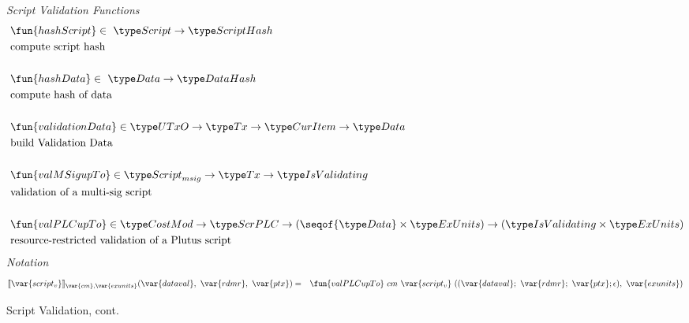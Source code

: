 \begin{figure*}[htb]
  \emph{Script Validation Functions}
  \begin{align*}
     &\fun{hashScript} \in  ~\Script\to \ScriptHash \\
     &\text{compute script hash} \\~\\
     &\fun{hashData} \in  ~\Data \to \DataHash \\
     &\text{compute hash of data} \\~\\
     &\fun{validationData} \in  \UTxO \to \Tx \to \CurItem \to \Data \\
     &\text{build Validation Data} \\~\\
     &\fun{valMSigupTo} \in\ScriptMSig\to \Tx \to \IsValidating  \\
     &\text{validation of a multi-sig script} \\~\\
     &\fun{valPLCupTo} \in \CostMod \to\ScrPLC \to
    (\seqof{\Data} \times \ExUnits) \to (\IsValidating \times \ExUnits) \\
     &\text{resource-restricted validation of a Plutus script}
  \end{align*}
  \emph{Notation}
  \begin{align*}
    \llbracket \var{script_v} \rrbracket_{\var{cm},\var{exunits}}(\var{dataval},~\var{rdmr},~\var{ptx})
    &=& \fun{valPLCupTo} ~{cm}~\var{script_v}~((\var{dataval};~\var{rdmr};~\var{ptx};\epsilon),~
    \var{exunits})
  \end{align*}
  \caption{Script Validation, cont.}
  \label{fig:defs:functions-valid}
\end{figure*}


\clearpage
